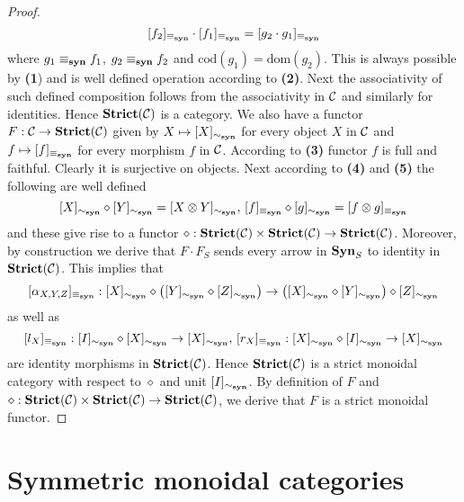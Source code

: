 \begin{proof}
$$[f_2]_{\equiv_{\mathbf{syn}}}\cdot [f_1]_{\equiv_{\mathbf{syn}}} = [g_2\cdot g_1]_{\equiv_{\mathbf{syn}}}$$
where $g_1\equiv_{\mathbf{syn}} f_1$, $g_2\equiv_{\mathbf{syn}} f_2$ and $\mathrm{cod}(g_1) = \mathrm{dom}(g_2)$. This is always possible by \textbf{(1}) and is well defined operation according to \textbf{(2)}. Next the associativity of such defined composition follows from the associativity in ${\mathcal C}$ and similarly for identities. Hence $\mathbf{Strict}({\mathcal C})$ is a category. We also have a functor $F:{\mathcal C}\rightarrow \mathbf{Strict}({\mathcal C})$ given by $X\mapsto [X]_{\sim_{\mathbf{syn}}}$ for every object $X$ in ${\mathcal C}$ and $f\mapsto [f]_{\equiv_{\mathbf{syn}}}$ for every morphism $f$ in ${\mathcal C}$. According to \textbf{(3)} functor $f$ is full and faithful. Clearly it is surjective on objects. Next according to \textbf{(4)} and \textbf{(5)} the following are well defined
$$[X]_{\sim_{\mathbf{syn}}}\diamond [Y]_{\sim_{\mathbf{syn}}} = [X\otimes Y]_{\sim_{\mathbf{syn}}},\,[f]_{\equiv_{\mathbf{syn}}}\diamond [g]_{\sim_{\mathbf{syn}}} = [f\otimes g]_{\equiv_{\mathbf{syn}}}$$
and these give rise to a functor $\diamond:\mathbf{Strict}({\mathcal C})\times \mathbf{Strict}({\mathcal C})\rightarrow \mathbf{Strict}({\mathcal C})$. Moreover, by construction we derive that $F\cdot F_S$ sends every arrow in $\mathbf{Syn}_S$ to identity in $\mathbf{Strict}({\mathcal C})$. This implies that
$$[\alpha_{X,Y,Z}]_{\equiv_{\mathbf{syn}}}:[X]_{\sim_{\mathbf{syn}}}\diamond \left([Y]_{\sim_{\mathbf{syn}}}\diamond [Z]_{\sim_{\mathbf{syn}}}\right)\rightarrow \left([X]_{\sim_{\mathbf{syn}}}\diamond [Y]_{\sim_{\mathbf{syn}}}\right)\diamond [Z]_{\sim_{\mathbf{syn}}}$$
as well as
$$[l_X]_{\equiv_{\mathbf{syn}}}:[I]_{\sim_{\mathbf{syn}}}\diamond [X]_{\sim_{\mathbf{syn}}}\rightarrow [X]_{\sim_{\mathbf{syn}}},\,[r_X]_{\equiv_{\mathbf{syn}}}:[X]_{\sim_{\mathbf{syn}}}\diamond [I]_{\sim_{\mathbf{syn}}}\rightarrow [X]_{\sim_{\mathbf{syn}}}$$
are identity morphisms in $\mathbf{Strict}({\mathcal C})$. Hence $\mathbf{Strict}({\mathcal C})$ is a strict monoidal category with respect to $\diamond$ and unit $[I]_{\sim_{\mathbf{syn}}}$. By definition of $F$ and $\diamond:\mathbf{Strict}({\mathcal C})\times \mathbf{Strict}({\mathcal C})\rightarrow \mathbf{Strict}({\mathcal C})$, we derive that $F$ is a strict monoidal functor.
\end{proof}

\section{Symmetric monoidal categories}

